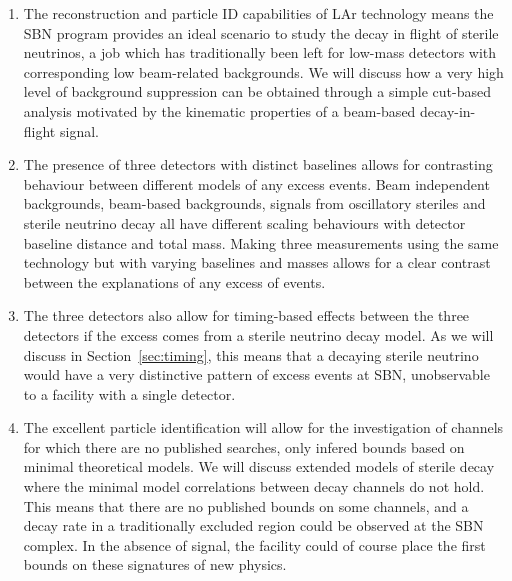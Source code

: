 \documentclass[11pt, a4paper]{article}
\newcommand{\refsec}[1]{Section~\ref{#1}}
\begin{document}
\begin{enumerate}

\item The reconstruction and particle ID capabilities of LAr technology means
the SBN program provides an ideal scenario to study the decay in flight of
sterile neutrinos, a job which has traditionally been left for low-mass
detectors with corresponding low beam-related backgrounds. 
%
We will discuss how a very high level of background suppression can be obtained
through a simple cut-based analysis motivated by the kinematic properties
of a beam-based decay-in-flight signal. 

\item The presence of three detectors with distinct baselines allows for 
contrasting behaviour between different models of any excess events. Beam 
independent backgrounds, beam-based backgrounds, signals from oscillatory 
steriles and sterile neutrino decay all have different scaling behaviours 
with detector baseline distance and total mass. Making three measurements using 
the same technology but with varying baselines and masses allows for a clear 
contrast between the explanations of any excess of events.

\item The three detectors also allow for timing-based effects between 
the three detectors if the excess comes from a sterile neutrino decay 
model. As we will discuss in \refsec{sec:timing}, this means that a decaying 
sterile neutrino would have a very distinctive pattern of excess events at
SBN, unobservable to a facility with a single detector.

\item The excellent particle identification will allow for the investigation of
channels for which there are no published searches, only infered bounds based
on minimal theoretical models. We will discuss extended models of sterile decay
where the minimal model correlations between decay channels do not hold. This
means that there are no published bounds on some channels, and a decay rate in
a traditionally excluded region could be observed at the SBN complex. In the
absence of signal, the facility could of course place the first bounds on these
signatures of new physics.

\end{enumerate} 
\end{document}
